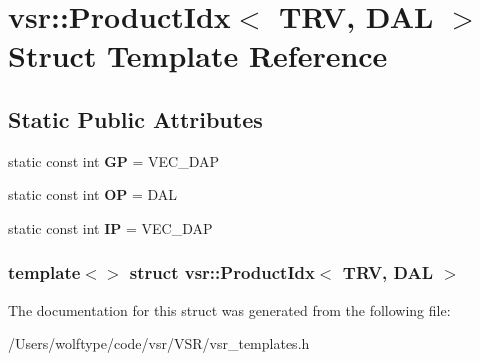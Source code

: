\hypertarget{structvsr_1_1_product_idx_3_01_t_r_v_00_01_d_a_l_01_4}{\section{vsr\-:\-:Product\-Idx$<$ T\-R\-V, D\-A\-L $>$ Struct Template Reference}
\label{structvsr_1_1_product_idx_3_01_t_r_v_00_01_d_a_l_01_4}
}
\subsection*{Static Public Attributes}
\begin{DoxyCompactItemize}
\item 
\hypertarget{structvsr_1_1_product_idx_3_01_t_r_v_00_01_d_a_l_01_4_a7c8140325ca897e23f7e9b93d29ec603}{static const int {\bfseries G\-P} = V\-E\-C\-\_\-\-D\-A\-P}\label{structvsr_1_1_product_idx_3_01_t_r_v_00_01_d_a_l_01_4_a7c8140325ca897e23f7e9b93d29ec603}

\item 
\hypertarget{structvsr_1_1_product_idx_3_01_t_r_v_00_01_d_a_l_01_4_ae8ae8fb6e6ab450eb24b207cbc934bae}{static const int {\bfseries O\-P} = D\-A\-L}\label{structvsr_1_1_product_idx_3_01_t_r_v_00_01_d_a_l_01_4_ae8ae8fb6e6ab450eb24b207cbc934bae}

\item 
\hypertarget{structvsr_1_1_product_idx_3_01_t_r_v_00_01_d_a_l_01_4_a48a61c48b64e4b7102198380aee4f28c}{static const int {\bfseries I\-P} = V\-E\-C\-\_\-\-D\-A\-P}\label{structvsr_1_1_product_idx_3_01_t_r_v_00_01_d_a_l_01_4_a48a61c48b64e4b7102198380aee4f28c}

\end{DoxyCompactItemize}
\subsubsection*{template$<$$>$ struct vsr\-::\-Product\-Idx$<$ T\-R\-V, D\-A\-L $>$}



The documentation for this struct was generated from the following file\-:\begin{DoxyCompactItemize}
\item 
/\-Users/wolftype/code/vsr/\-V\-S\-R/vsr\-\_\-templates.\-h\end{DoxyCompactItemize}
